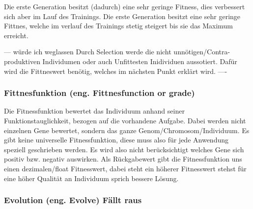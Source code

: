 Die erste Generation besitzt (dadurch) eine sehr geringe Fitness, dies verbessert sich aber im Lauf des Trainings.
Die erste Generation besitzt eine sehr geringe Fittnes, welche im verlauf des Trainings stetig steigert bis sie das Maximum erreicht.

--- würde ich weglassen
Durch Selection werde die nicht unnötigen/Contra-produktiven Individumen oder auch Unfittesten Inidividuen aussotiert.
Dafür wird die Fittneswert benötig, welches im nächsten Punkt erklärt wird.
----


\subsubsection{Fittnesfunktion (eng. Fittnesfunction or grade)}
Die Fitnessfunktion bewertet das Individuum anhand seiner Funktionstauglichkeit, bezogen auf die vorhandene Aufgabe. Dabei werden nicht einzelnen Gene bewertet, sondern das ganze Genom/Chromosom/Individuum. Es gibt keine universelle Fitnessfunktion, diese muss also für jede Anwendung speziell geschrieben werden. Es wird also nicht berücksichtigt welches Gene sich positiv bzw. negativ auswirken. Als Rückgabewert gibt die Fitnessfunktion uns einen dezimalen/float Fitnesswert, dabei steht ein höherer Fitnesswert stehst für eine höher Qualität an Individuum sprich bessere Lösung.

\iffalse
\subsubsection{Evolution (eng. Evolve) Fällt raus}

